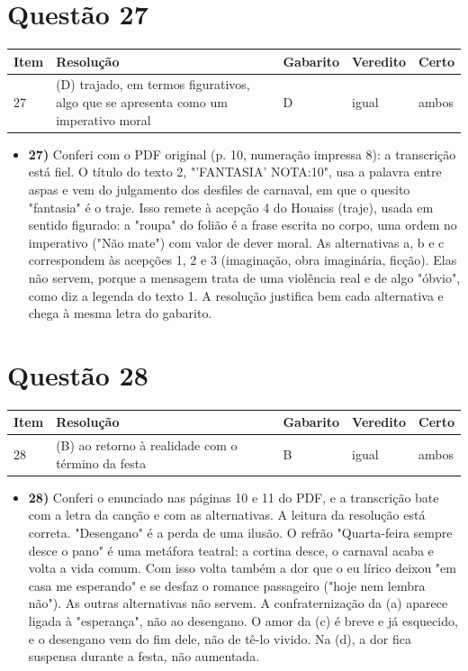 \documentclass{article}%
\begin{document}
\section*{Questão 27}%
\begin{longtable}{@{}p{} p{} p{} p{} p{}@{}}\toprule Item & Resolução & Gabarito & Veredito & Certo \\ \midrule
27 & (D) trajado, em termos figurativos, algo que se apresenta como um imperativo moral & D & igual & ambos \\
\bottomrule\end{longtable}%
\begin{itemize}%
\item%
\textbf{27)} Conferi com o PDF original (p. 10, numeração impressa 8): a transcrição está fiel. O título do texto 2, "'FANTASIA' NOTA:10", usa a palavra entre aspas e vem do julgamento dos desfiles de carnaval, em que o quesito "fantasia" é o traje. Isso remete à acepção 4 do Houaiss (traje), usada em sentido figurado: a "roupa" do folião é a frase escrita no corpo, uma ordem no imperativo ("Não mate") com valor de dever moral. As alternativas a, b e c correspondem às acepções 1, 2 e 3 (imaginação, obra imaginária, ficção). Elas não servem, porque a mensagem trata de uma violência real e de algo "óbvio", como diz a legenda do texto 1. A resolução justifica bem cada alternativa e chega à mesma letra do gabarito.%
\end{itemize}%
\section*{Questão 28}%
\begin{longtable}{@{}p{} p{} p{} p{} p{}@{}}\toprule Item & Resolução & Gabarito & Veredito & Certo \\ \midrule
28 & (B) ao retorno à realidade com o término da festa & B & igual & ambos \\
\bottomrule\end{longtable}%
\begin{itemize}%
\item%
\textbf{28)} Conferi o enunciado nas páginas 10 e 11 do PDF, e a transcrição bate com a letra da canção e com as alternativas. A leitura da resolução está correta. "Desengano" é a perda de uma ilusão. O refrão "Quarta{-}feira sempre desce o pano" é uma metáfora teatral: a cortina desce, o carnaval acaba e volta a vida comum. Com isso volta também a dor que o eu lírico deixou "em casa me esperando" e se desfaz o romance passageiro ("hoje nem lembra não"). As outras alternativas não servem. A confraternização da (a) aparece ligada à "esperança", não ao desengano. O amor da (c) é breve e já esquecido, e o desengano vem do fim dele, não de tê{-}lo vivido. Na (d), a dor fica suspensa durante a festa, não aumentada.%
\end{itemize}%
\end{document}
